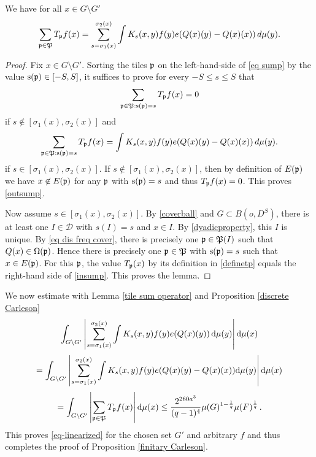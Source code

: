 \begin{lemma} \label{tile sum operator}
We have for all $x\in G\setminus G'$
\begin{equation}\label{eq sump}
    \sum_{\mathfrak p\in \mathfrak P}T_{\mathfrak p} f(x)= \sum_{s=\sigma_1(x)}^{\sigma_2(x)}
    \int   K_{s}(x,y) f(y) e({Q}(x)(y)-{Q}(x)(x))\, d\mu(y).
\end{equation}
\end{lemma}
\begin{proof}
Fix $x\in G\setminus G'$.
Sorting the tiles $\mathfrak p$ on the left-hand-side of \eqref{eq sump} by the value $\mathrm{s}(\mathfrak p)\in [-S,S]$,
it suffices to prove  for every $-S\le s\le S$ that
\begin{equation}\label{outsump}
    \sum_{\mathfrak p\in \mathfrak P: \mathrm{s}(\mathfrak p)=s}T_{\mathfrak p} f(x)=0
\end{equation}
 if $s\not\in [\sigma_1(x), \sigma_2(x)]$ and
\begin{equation}\label{insump}
    \sum_{\mathfrak p\in \mathfrak P: \mathrm{s}(\mathfrak p)=s}T_{\mathfrak p} f(x)=
    \int   K_{s}(x,y) f(y) e({Q}(x)(y) - {Q}(x)(x))\, d\mu(y).
\end{equation}
if $s\in [\sigma_1(x),\sigma_2(x)]$.
If $s\not\in [\sigma_1(x), \sigma_2(x)]$, then by definition of $E(\mathfrak p)$ we have
$x\not\in E(\mathfrak p)$ for any $\mathfrak p$ with $\mathrm{s}(\mathfrak p)=s$ and thus $T_{\mathfrak p} f(x)=0$. This proves
\eqref{outsump}.

Now assume $s\in [\sigma_1(x),\sigma_2(x)]$.
By \eqref{coverball} and $G\subset B(o,D^S)$, there is at least
one $I\in \mathcal{D}$ with $s(I)=s$ and $x\in I$.
By \eqref{dyadicproperty}, this $I$ is unique. By \eqref{eq dis freq cover}, there is precisely one $\mathfrak p\in \mathfrak P(I)$ such that
${Q}(x)\in \Omega(\mathfrak p)$. Hence there is precisely one  $\mathfrak p\in \mathfrak P$ with  $\mathrm{s}(\mathfrak p)=s$ such that
$x\in E(\mathfrak p)$. For this $\mathfrak p$, the value $T_{\mathfrak p}(x)$ by its definition in \eqref{definetp}
equals the right-hand side of \eqref{insump}. This proves the lemma.
\end{proof}

We now estimate with Lemma \ref{tile sum operator} and Proposition \ref{discrete Carleson}
\begin{equation}
 \int_{G \setminus G'} \left|\sum_{s={\sigma_1}(x)}^{{\sigma_2}(x)} \int K_s(x,y) f(y) e({Q}(x)(y))  \, \mathrm{d}\mu(y)\right| \mathrm{d}\mu(x)
\end{equation}
\begin{equation}
 =\int_{G \setminus G'} \left|\sum_{s={\sigma_1}(x)}^{{\sigma_2}(x)} \int K_s(x,y) f(y) e({Q}(x)(y) - {Q}(x)(x))\mathrm{d}\mu(y)\right| \mathrm{d}\mu(x)
\end{equation}
\begin{equation}
 =\int_{G \setminus G'} \left|\sum_{\mathfrak p\in \mathfrak P}T_{\mathfrak p} f(x)\right| \mathrm{d}\mu(x)
 \le \frac{2^{260a^3}}{(q-1)^4} \mu(G)^{1 -  \frac{1}{q}} \mu(F)^{\frac{1}{q}} \,.
\end{equation}
This proves \eqref{eq-linearized} for the chosen set $G'$ and arbitrary $f$ and thus completes the proof of Proposition
\ref{finitary Carleson}.



